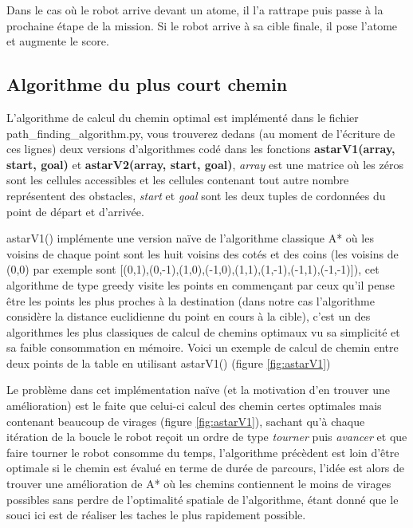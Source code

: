 \documentclass{article}
\begin{document}
Dans le cas où le robot arrive devant un atome, il l'a rattrape puis passe à la prochaine étape de la mission. Si le robot arrive à sa cible finale, il pose l'atome et augmente le score.


\subsection{Algorithme du plus court chemin}
L'algorithme de calcul du chemin optimal est implémenté dans le fichier \\   path\_finding\_algorithm.py, vous trouverez dedans (au moment de l'écriture de ces lignes) deux versions d'algorithmes codé dans les fonctions \textbf{astarV1(array, start, goal)} et \textbf{astarV2(array, start, goal)}, \textit{array} est une matrice où les zéros sont les cellules accessibles et les cellules contenant tout autre nombre représentent des obstacles, \textit{start} et \textit{goal} sont les deux tuples de cordonnées du point de départ et d'arrivée.

astarV1() implémente une version naïve de l'algorithme classique A* où les voisins de chaque point sont les huit voisins des cotés et des coins (les voisins de (0,0) par exemple sont [(0,1),(0,-1),(1,0),(-1,0),(1,1),(1,-1),(-1,1),(-1,-1)]), cet algorithme de type greedy visite les points en commençant par ceux qu'il pense être les points les plus proches à la destination (dans notre cas l'algorithme considère la distance euclidienne du point en cours à la cible), c'est un des algorithmes les plus classiques de calcul de chemins optimaux vu sa simplicité et sa faible consommation en mémoire. Voici un exemple de calcul de chemin entre deux points de la table en utilisant astarV1() (figure \ref{fig:astarV1})

Le problème dans cet implémentation naïve (et la motivation d'en trouver une amélioration) est le faite que celui-ci calcul des chemin certes optimales mais contenant beaucoup de virages (figure \ref{fig:astarV1}), sachant qu'à chaque itération de la boucle le robot reçoit un ordre de type \textit{tourner} puis \textit{avancer} et que faire tourner le robot consomme du temps, l'algorithme précèdent est loin d'être optimale si le chemin est évalué en terme de durée de parcours, l'idée est alors de trouver une amélioration de A* où les chemins contiennent le moins de virages possibles sans perdre de l'optimalité spatiale de l'algorithme, étant donné que le souci ici est de réaliser les taches le plus rapidement possible.
\end{document}
